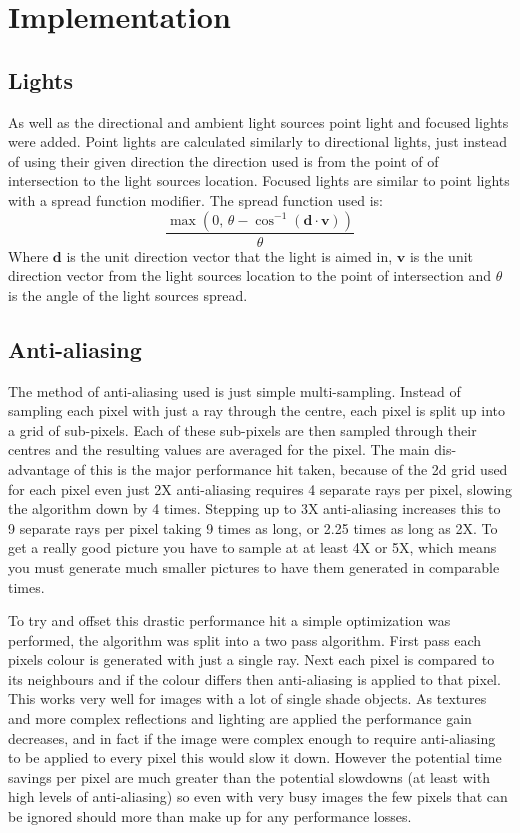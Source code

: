 \chapter{Implementation}
  \section{Lights}
    As well as the directional and ambient light sources point light and focused
    lights were added.  Point lights are calculated similarly to directional
    lights, just instead of using their given direction the direction used is
    from the point of of intersection to the light sources location.  Focused
    lights are similar to point lights with a spread function modifier.  The
    spread function used is:
    \[ \frac{\max\left(0,\, \theta - \cos^{-1}\left( \mathbf{d} \cdot
    \mathbf{v}\right)\right)}{\theta} \]
    Where $\mathbf{d}$ is the unit direction vector that the light is aimed in,
    $\mathbf{v}$ is the unit direction vector from the light sources location to
    the point of intersection and $\theta$ is the angle of the light sources
    spread.

  \section{Anti-aliasing}
    The method of anti-aliasing used is just simple multi-sampling.  Instead of
    sampling each pixel with just a ray through the centre, each pixel is split
    up into a grid of sub-pixels.  Each of these sub-pixels are then sampled
    through their centres and the resulting values are averaged for the pixel.
    The main dis-advantage of this is the major performance hit taken, because
    of the 2d grid used for each pixel even just 2X anti-aliasing requires 4
    separate rays per pixel, slowing the algorithm down by 4 times.  Stepping up
    to 3X anti-aliasing increases this to 9 separate rays per pixel taking 9
    times as long, or 2.25 times as long as 2X.  To get a really good picture
    you have to sample at at least 4X or 5X, which means you must generate much
    smaller pictures to have them generated in comparable times.

    To try and offset this drastic performance hit a simple optimization was
    performed, the algorithm was split into a two pass algorithm.  First pass
    each pixels colour is generated with just a single ray.  Next each pixel is
    compared to its neighbours and if the colour differs then anti-aliasing is
    applied to that pixel.  This works very well for images with a lot of single
    shade objects.  As textures and more complex reflections and lighting are
    applied the performance gain decreases, and in fact if the image were complex
    enough to require anti-aliasing to be applied to every pixel this would slow
    it down.  However the potential time savings per pixel are much greater than
    the potential slowdowns (at least with high levels of anti-aliasing) so even
    with very busy images the few pixels that can be ignored should more than
    make up for any performance losses.

